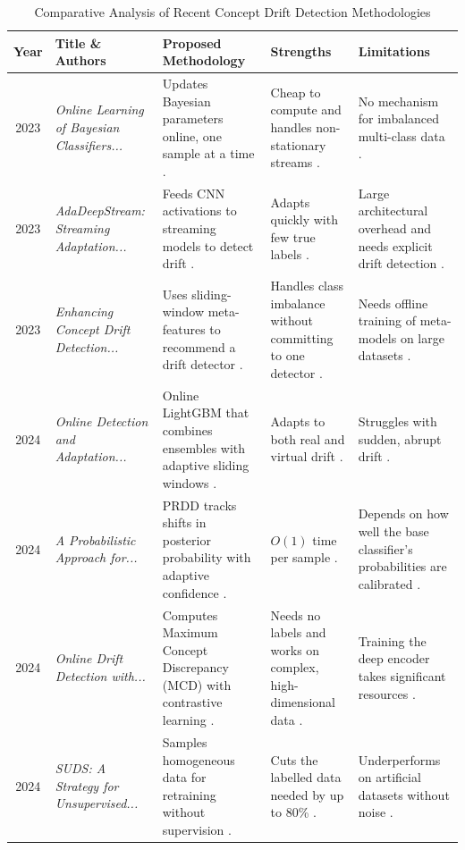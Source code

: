 \documentclass[conference]{IEEEtran}
\begin{document}
\begin{table}[htbp]
\caption{Comparative Analysis of Recent Concept Drift Detection Methodologies}
\begin{center}
\footnotesize
\begin{tabular}{|c|p{}|p{}|p{}|p{}|}
\hline
\textbf{Year} & \textbf{Title \& Authors} & \textbf{Proposed Methodology} & \textbf{Strengths} & \textbf{Limitations} \\
\hline
2023 & \textit{Online Learning of Bayesian Classifiers...} \cite{wu2023} & Updates Bayesian parameters online, one sample at a time \cite{wu2023}. & Cheap to compute and handles non-stationary streams \cite{wu2023}. & No mechanism for imbalanced multi-class data \cite{wu2023}. \\
\hline
2023 & \textit{AdaDeepStream: Streaming Adaptation...} \cite{chambers2023} & Feeds CNN activations to streaming models to detect drift \cite{chambers2023}. & Adapts quickly with few true labels \cite{chambers2023}. & Large architectural overhead and needs explicit drift detection \cite{chambers2023}. \\
\hline
2023 & \textit{Enhancing Concept Drift Detection...} \cite{aguiar2023} & Uses sliding-window meta-features to recommend a drift detector \cite{aguiar2023}. & Handles class imbalance without committing to one detector \cite{aguiar2023}. & Needs offline training of meta-models on large datasets \cite{aguiar2023}. \\
\hline
2024 & \textit{Online Detection and Adaptation...} \cite{mulimani2024} & Online LightGBM that combines ensembles with adaptive sliding windows \cite{mulimani2024}. & Adapts to both real and virtual drift \cite{mulimani2024}. & Struggles with sudden, abrupt drift \cite{mulimani2024}. \\
\hline
2024 & \textit{A Probabilistic Approach for...} \cite{parasteh2024} & PRDD tracks shifts in posterior probability with adaptive confidence \cite{parasteh2024}. & $O(1)$ time per sample \cite{parasteh2024}. & Depends on how well the base classifier's probabilities are calibrated \cite{parasteh2024}. \\
\hline
2024 & \textit{Online Drift Detection with...} \cite{wan2024} & Computes Maximum Concept Discrepancy (MCD) with contrastive learning \cite{wan2024}. & Needs no labels and works on complex, high-dimensional data \cite{wan2024}. & Training the deep encoder takes significant resources \cite{wan2024}. \\
\hline
2024 & \textit{SUDS: A Strategy for Unsupervised...} \cite{fellicious2024} & Samples homogeneous data for retraining without supervision \cite{fellicious2024}. & Cuts the labelled data needed by up to 80\% \cite{fellicious2024}. & Underperforms on artificial datasets without noise \cite{fellicious2024}. \\

\end{tabular}
\end{center}
\end{table}
\end{document}
